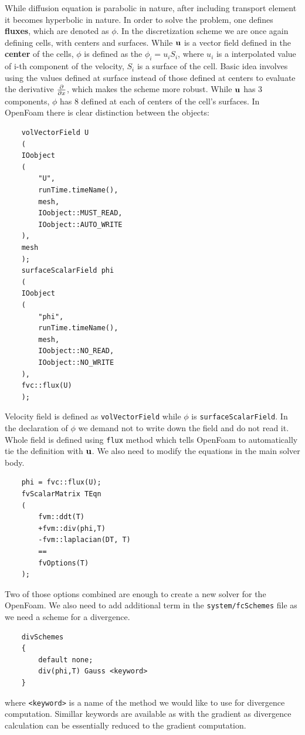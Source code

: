 \documentclass{article}
\begin{document}
While diffusion equation is parabolic in nature, after including transport element it becomes hyperbolic in nature. In order to solve the problem, one defines \textbf{fluxes},
which are denoted as $\phi$. In the discretization scheme we are once again defining cells, with centers and surfaces.
While $\vb{u}$ is a vector field defined in the \textbf{center}
of the cells, $\phi$ is defined as the $\phi_i = u_i S_i$, where $u_i$ is a interpolated value of i-th component of the velocity, $S_i$ is a surface of the cell.
Basic idea involves using the values defined at surface instead of those defined at centers to evaluate the derivative $\pdv{x}$, which makes the scheme more robust.
While $\vb{u}$ has $3$ components, $\phi$ has $8$ defined at each of centers of the cell's surfaces. In OpenFoam there is clear distinction between the objects:

\begin{verbatim}
    volVectorField U
    (
    IOobject
    (
        "U",
        runTime.timeName(),
        mesh,
        IOobject::MUST_READ,
        IOobject::AUTO_WRITE
    ),
    mesh
    );
    surfaceScalarField phi
    (
    IOobject
    (
        "phi",
        runTime.timeName(),
        mesh,
        IOobject::NO_READ,
        IOobject::NO_WRITE
    ),
    fvc::flux(U)
    );
\end{verbatim}
Velocity field is defined as \texttt{volVectorField} while $\phi$ is \texttt{surfaceScalarField}.
In the declaration of $\phi$ we demand not to write down the field and do not read it. Whole field is defined using \texttt{flux} method which 
tells OpenFoam to automatically tie the definition with $\vb{u}$.
We also need to modify the equations in the main solver body.
\begin{verbatim}
    phi = fvc::flux(U);
    fvScalarMatrix TEqn
    (
        fvm::ddt(T) 
        +fvm::div(phi,T)
        -fvm::laplacian(DT, T)
        ==
        fvOptions(T)
    );
\end{verbatim}
Two of those options combined are enough to create a new solver for the OpenFoam.
We also need to add additional term in the \texttt{system/fcSchemes} file as we need a scheme for a divergence.
\begin{verbatim}
    divSchemes
    {
        default none;
        div(phi,T) Gauss <keyword>
    }
\end{verbatim}
where \texttt{<keyword>} is a name of the method we would like to use for divergence computation.
Simillar keywords are available as with the gradient as divergence calculation can be essentially reduced to the gradient computation. 
\end{document}
